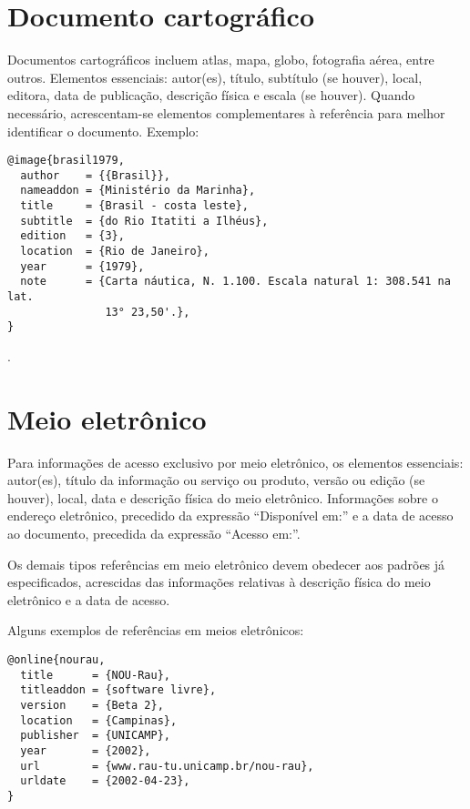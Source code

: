 \section{Documento cartográfico}

Documentos cartográficos incluem atlas, mapa, globo, fotografia aérea, entre outros.
Elementos essenciais: autor(es), título, subtítulo (se houver), local, editora, data de publicação, descrição física e escala (se houver). Quando necessário, acrescentam-se elementos complementares à referência para melhor identificar o documento.
Exemplo:

\vspace*{1em}

\begin{Verbatim}[frame=single]
@image{brasil1979,
  author    = {{Brasil}},
  nameaddon = {Ministério da Marinha},
  title     = {Brasil - costa leste},
  subtitle  = {do Rio Itatiti a Ilhéus},
  edition   = {3},
  location  = {Rio de Janeiro},
  year      = {1979},
  note      = {Carta náutica, N. 1.100. Escala natural 1: 308.541 na lat.
               13° 23,50'.},
}
\end{Verbatim}

\noindent
{}.


\section{Meio eletrônico}

Para informações de acesso exclusivo por meio eletrônico, os elementos essenciais: autor(es), título da informação ou serviço ou produto, versão ou edição (se houver), local, data e descrição física do meio eletrônico. Informações sobre o endereço eletrônico, precedido da expressão ``Disponível em:'' e a data de acesso ao documento, precedida da expressão ``Acesso em:''.

Os demais tipos referências em meio eletrônico devem obedecer aos padrões já especificados, acrescidas das informações relativas à descrição física do meio eletrônico e a data de acesso.


Alguns exemplos de referências em meios eletrônicos:

\vspace*{1em}

\begin{Verbatim}[frame=single]
@online{nourau,
  title      = {NOU-Rau},
  titleaddon = {software livre},
  version    = {Beta 2},
  location   = {Campinas},
  publisher  = {UNICAMP},
  year       = {2002},
  url        = {www.rau-tu.unicamp.br/nou-rau},
  urldate    = {2002-04-23},
}
\end{Verbatim}

